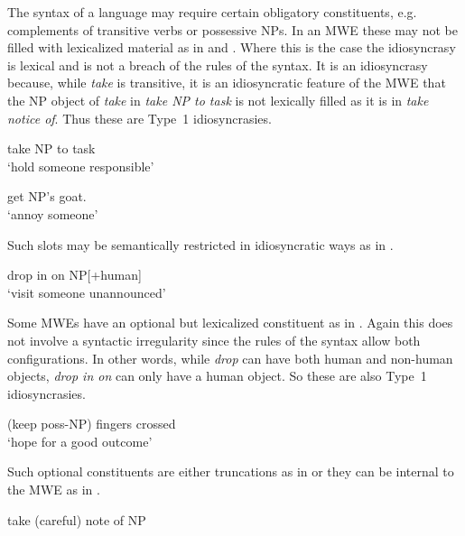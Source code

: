 \documentclass[output=paper]{langsci/langscibook}
\begin{document}
The syntax of a language may require certain obligatory constituents, e.g. 
complements of transitive verbs or possessive NPs. In an MWE these may not 
be filled with lexicalized material as in  and 
. Where this is the case the idiosyncrasy is lexical and is 
not a breach of the rules of the syntax. It is an idiosyncrasy because, 
while \textit{take} is transitive, it is an idiosyncratic feature of the 
MWE that the NP object of \textit{take} in \textit{take NP to task} is not 
lexically filled as it is in \textit{take notice of}. 
Thus these are Type~1 idiosyncrasies.

\begin{exe}
\ex\label{ex:ex31} take NP to task\\
‘hold someone responsible’



\ex\label{ex:ex32} get NP’s goat.\\
‘annoy someone’
\end{exe}



Such slots may be semantically restricted in idiosyncratic ways as in .

\begin{exe}
\ex\label{ex:ex33} drop in on NP[+human]\\
‘visit someone unannounced’
\end{exe}



Some MWEs have an optional but lexicalized constituent as in . Again this does not involve a syntactic irregularity since the rules of the syntax allow both configurations. In other words, while \textit{drop} can have both human and non-human objects, \textit{drop in on} can only have a human object. So these are also Type~1 idiosyncrasies.

\begin{exe}
\ex\label{ex:ex34} (keep poss{}-NP) fingers crossed\\
‘hope for a good outcome’
\end{exe}



Such optional constituents are either truncations  as in  or they can be internal to the MWE as in .

\begin{exe}
\ex\label{ex:ex35}  take (careful) note of NP
\end{exe}
\end{document}
